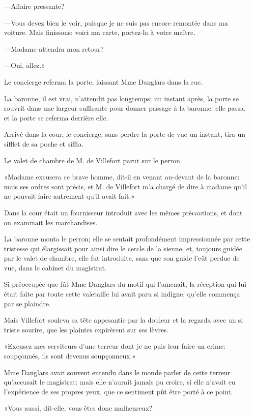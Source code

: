 —Affaire pressante? 

—Vous devez bien le voir, puisque je ne suis pas encore remontée dans ma voiture. Mais finissons: voici ma carte, portez-la à votre maître. 

—Madame attendra mon retour? 

—Oui, allez.» 

Le concierge referma la porte, laissant Mme Danglars dans la rue. 

La baronne, il est vrai, n'attendit pas longtemps; un instant après, la porte se rouvrit dans une largeur suffisante pour donner passage à la baronne: elle passa, et la porte se referma derrière elle. 

Arrivé dans la cour, le concierge, sans perdre la porte de vue un instant, tira un sifflet de sa poche et siffla. 

Le valet de chambre de M. de Villefort parut sur le perron. 

«Madame excusera ce brave homme, dit-il en venant au-devant de la baronne: mais ses ordres sont précis, et M. de Villefort m'a chargé de dire à madame qu'il ne pouvait faire autrement qu'il avait fait.» 

Dans la cour était un fournisseur introduit avec les mêmes précautions, et dont on examinait les marchandises. 

La baronne monta le perron; elle se sentait profondément impressionnée par cette tristesse qui élargissait pour ainsi dire le cercle de la sienne, et, toujours guidée par le valet de chambre, elle fut introduite, sans que son guide l'eût perdue de vue, dans le cabinet du magistrat. 

Si préoccupée que fût Mme Danglars du motif qui l'amenait, la réception qui lui était faite par toute cette valetaille lui avait paru si indigne, qu'elle commença par se plaindre. 

Mais Villefort souleva sa tête appesantie par la douleur et la regarda avec un si triste sourire, que les plaintes expirèrent sur ses lèvres. 

«Excusez mes serviteurs d'une terreur dont je ne puis leur faire un crime: soupçonnés, ils sont devenus soupçonneux.» 

Mme Danglars avait souvent entendu dans le monde parler de cette terreur qu'accusait le magistrat; mais elle n'aurait jamais pu croire, si elle n'avait eu l'expérience de ses propres yeux, que ce sentiment pût être porté à ce point. 

«Vous aussi, dit-elle, vous êtes donc malheureux? 

